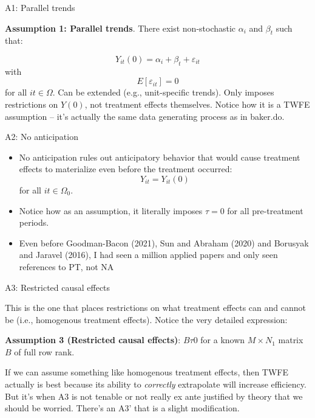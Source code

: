 \documentclass{beamer}
\begin{document}
\begin{frame}{A1: Parallel trends}

\textbf{Assumption 1: Parallel trends}. There exist non-stochastic $\alpha_i$ and $\beta_t$ such that:

$$Y_{it}(0) = \alpha_i + \beta_t + \varepsilon_{it}$$with $$E[\varepsilon_{it}]=0$$for all $it \in \Omega$. Can be extended (e.g., unit-specific trends). Only imposes restrictions on $Y(0)$, not treatment effects themselves. Notice how it is a TWFE assumption -- it's actually the same data generating process as in baker.do.

\end{frame}

\begin{frame}{A2: No anticipation}

\begin{itemize}
\item No anticipation rules out anticipatory behavior that would cause treatment effects to materialize even before the treatment occurred:$$Y_{it} = Y_{it}(0)$$ for all $it \in \Omega_0$. 
\item Notice how as an assumption, it literally imposes $\tau=0$ for all pre-treatment periods. 
\item Even before Goodman-Bacon (2021), Sun and Abraham (2020) and Borusyak and Jaravel (2016), I had seen a million applied papers and only seen references to PT, not NA
\end{itemize}

\end{frame}

\begin{frame}{A3: Restricted causal effects}

This is the one that places restrictions on what treatment effects can and cannot be (i.e., homogenous treatment effects). Notice the very detailed expression:

\bigskip

\textbf{Assumption 3 (Restricted causal effects)}: $B\tau0$ for a known $M \times N_1$ matrix $B$ of full row rank. 

\bigskip

If we can assume something like homogenous treatment effects, then TWFE actually is best because its ability to \emph{correctly} extrapolate will increase efficiency. But it's when A3 is not tenable or not really ex ante justified by theory that we should be worried. There's an A3' that is a slight modification. 

\end{frame}
\end{document}
